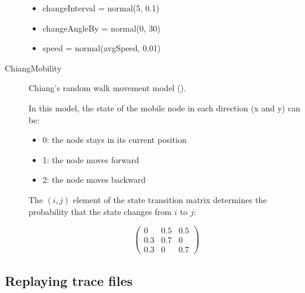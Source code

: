 \begin{description}
\begin{itemize}
\item changeInterval = normal(5, 0.1)
\item changeAngleBy = normal(0, 30)
\item speed = normal(avgSpeed, 0.01)
\end{itemize}

\item[ChiangMobility] Chiang's random walk movement model
(\cite{Chiang98wirelessnetwork}).

In this model, the state of the mobile node in each direction (x and y) can be:

\begin{itemize}
  \item 0: the node stays in its current position
  \item 1: the node moves forward
  \item 2: the node moves backward
\end{itemize}

The $(i,j)$ element of the state transition matrix determines the
probability that the state changes from $i$ to $j$:

$$ \left(
\begin{array}{ccc}
  0 & 0.5 & 0.5 \\
  0.3 & 0.7 & 0 \\
  0.3 & 0 & 0.7
\end{array}
\right) $$

\end{description}

\subsection{Replaying trace files}

